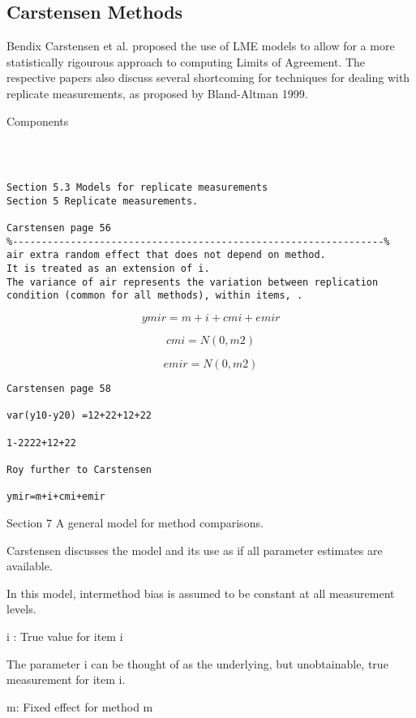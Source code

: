 \documentclass{report}
\begin{document}
\subsection{Carstensen Methods}
Bendix Carstensen et al. proposed the use of LME models to allow for a more statistically rigourous approach to computing Limits of Agreement.  The respective papers also discuss several shortcoming for techniques for dealing with replicate measurements, as proposed by Bland-Altman 1999.

Components

\begin{verbatim}



Section 5.3 Models for replicate measurements
Section 5 Replicate measurements.

Carstensen page 56
%----------------------------------------------------------------%
air extra random effect that does not depend on method.
It is treated as an extension of i.
The variance of air represents the variation between replication condition (common for all methods), within items, .
\end{verbatim}
\[ymir=m+i+cmi+emir\]

\[cmi=N(0,m2)\]

\[emir=N(0,m2)\]

\begin{verbatim}
Carstensen page 58

var(y10-y20) =12+22+12+22

1-2222+12+22

Roy further to Carstensen

ymir=m+i+cmi+emir

\end{verbatim}


Section 7 A general model for method comparisons.

Carstensen discusses the model and its use as if all parameter estimates are available.

In this model, intermethod bias is assumed to be constant at all measurement levels.

i : True value for item i

The parameter i can be thought of as the underlying, but unobtainable, true measurement for item i.

m: Fixed effect for method m

%
%
\end{document}
